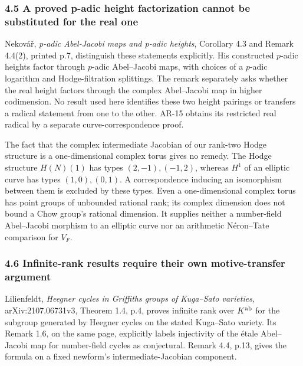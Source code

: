 \documentclass[11pt,a4paper]{article}
\begin{document}
\subsubsection{4.5 A proved p-adic height factorization cannot be
substituted for the real
one}\label{a-proved-p-adic-height-factorization-cannot-be-substituted-for-the-real-one}

Nekovář, \emph{p-adic Abel-Jacobi maps and p-adic heights}, Corollary
4.3 and Remark 4.4(2), printed p.7, distinguish these statements
explicitly. His constructed \(p\)-adic heights factor through \(p\)-adic
Abel--Jacobi maps, with choices of a \(p\)-adic logarithm and
Hodge-filtration splittings. The remark separately asks whether the real
height factors through the complex Abel--Jacobi map in higher
codimension. No result used here identifies these two height pairings or
transfers a radical statement from one to the other. AR-15 obtains its
restricted real radical by a separate curve-correspondence proof.

The fact that the complex intermediate Jacobian of our rank-two Hodge
structure is a one-dimensional complex torus gives no remedy. The Hodge
structure \(H(N)(1)\) has types \((2,-1),(-1,2)\), whereas \(H^1\) of an
elliptic curve has types \((1,0),(0,1)\). A correspondence inducing an
isomorphism between them is excluded by these types. Even a
one-dimensional complex torus has point groups of unbounded rational
rank; its complex dimension does not bound a Chow group's rational
dimension. It supplies neither a number-field Abel--Jacobi morphism to
an elliptic curve nor an arithmetic Néron--Tate comparison for \(V_F\).

\subsubsection{4.6 Infinite-rank results require their own
motive-transfer
argument}\label{infinite-rank-results-require-their-own-motive-transfer-argument}

Lilienfeldt, \emph{Heegner cycles in Griffiths groups of Kuga--Sato
varieties}, arXiv:2107.06731v3, Theorem 1.4, p.4, proves infinite rank
over \(K^{\rm ab}\) for the subgroup generated by Heegner cycles on the
stated Kuga--Sato variety. Its Remark 1.6, on the same page, explicitly
labels injectivity of the étale Abel--Jacobi map for number-field cycles
as conjectural. Remark 4.4, p.13, gives the formula on a fixed newform's
intermediate-Jacobian component.
\end{document}

